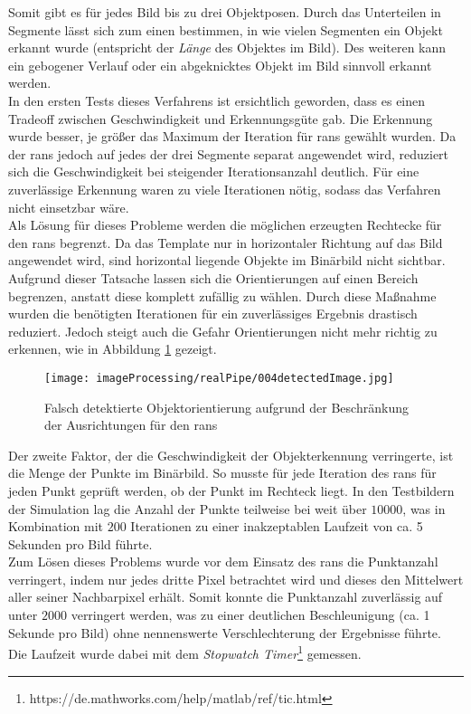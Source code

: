 Somit gibt es für jedes Bild bis zu drei Objektposen. Durch das Unterteilen in Segmente lässt sich zum einen bestimmen, in wie vielen Segmenten ein Objekt erkannt wurde (entspricht der \textit{Länge} des Objektes im Bild). Des weiteren kann ein gebogener Verlauf oder ein abgeknicktes Objekt im Bild sinnvoll erkannt werden.\\
In den ersten Tests dieses Verfahrens ist ersichtlich geworden, dass es einen Tradeoff zwischen Geschwindigkeit und Erkennungsgüte gab. Die Erkennung wurde besser, je größer das Maximum der Iteration für \gls{rans} gewählt wurden. Da der \gls{rans} jedoch auf jedes der drei Segmente separat angewendet wird, reduziert sich die Geschwindigkeit bei steigender Iterationsanzahl deutlich. Für eine zuverlässige Erkennung waren zu viele Iterationen nötig, sodass das Verfahren nicht einsetzbar wäre.\\
Als Lösung für dieses Probleme werden die möglichen erzeugten Rechtecke für den \gls{rans} begrenzt. Da das Template nur in horizontaler Richtung auf das Bild angewendet wird, sind horizontal liegende Objekte im Binärbild nicht sichtbar. Aufgrund dieser Tatsache lassen sich die Orientierungen auf einen Bereich begrenzen, anstatt diese komplett zufällig zu wählen. Durch diese Maßnahme wurden die benötigten Iterationen für ein zuverlässiges Ergebnis drastisch reduziert. Jedoch steigt auch die Gefahr Orientierungen nicht mehr richtig zu erkennen, wie in Abbildung \ref{detecFail} gezeigt.\\
\begin{figure}[H]
\centering
\texttt{[image: imageProcessing/realPipe/004detectedImage.jpg]}
\caption{Falsch detektierte Objektorientierung aufgrund der Beschränkung der Ausrichtungen für den \gls{rans}}
\label{detecFail}
\end{figure}
Der zweite Faktor, der die Geschwindigkeit der Objekterkennung verringerte, ist die Menge der Punkte im Binärbild. So musste für jede Iteration des \gls{rans} für jeden Punkt geprüft werden, ob der Punkt im Rechteck liegt. In den Testbildern der Simulation lag die Anzahl der Punkte teilweise bei weit über $10000$, was in Kombination mit $200$ Iterationen zu einer inakzeptablen Laufzeit von ca. 5 Sekunden pro Bild führte.\\
Zum Lösen dieses Problems wurde vor dem Einsatz des \gls{rans} die Punktanzahl verringert, indem nur jedes dritte Pixel betrachtet wird und dieses den Mittelwert aller seiner Nachbarpixel erhält.  Somit konnte die Punktanzahl zuverlässig auf unter $2000$ verringert werden, was zu einer deutlichen Beschleunigung (ca. 1 Sekunde pro Bild) ohne nennenswerte Verschlechterung der Ergebnisse führte. Die Laufzeit wurde dabei mit dem \matlab \textit{Stopwatch Timer}\footnote{https://de.mathworks.com/help/matlab/ref/tic.html} gemessen.
